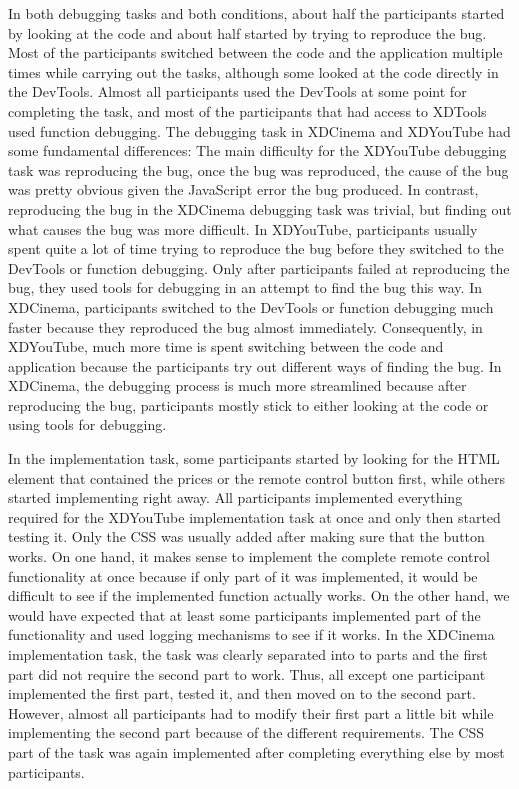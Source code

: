 In both debugging tasks and both conditions, about half the participants started by looking at the code and about half started by trying to reproduce the bug. Most of the participants switched between the code and the application multiple times while carrying out the tasks, although some looked at the code directly in the DevTools. Almost all participants used the DevTools at some point for completing the task, and most of the participants that had access to XDTools used function debugging. The debugging task in XDCinema and XDYouTube had some fundamental differences: The main difficulty for the XDYouTube debugging task was reproducing the bug, once the bug was reproduced, the cause of the bug was pretty obvious given the JavaScript error the bug produced. In contrast, reproducing the bug in the XDCinema debugging task was trivial, but finding out what causes the bug was more difficult. In XDYouTube, participants usually spent quite a lot of time trying to reproduce the bug before they switched to the DevTools or function debugging. Only after participants failed at reproducing the bug, they used tools for debugging in an attempt to find the bug this way. In XDCinema, participants switched to the DevTools or function debugging much faster because they reproduced the bug almost immediately. Consequently, in XDYouTube, much more time is spent switching between the code and application because the participants try out different ways of finding the bug. In XDCinema, the debugging process is much more streamlined because after reproducing the bug, participants mostly stick to either looking at the code or using tools for debugging.

In the implementation task, some participants started by looking for the HTML element that contained the prices or the remote control button first, while others started implementing right away. All participants implemented everything required for the XDYouTube implementation task at once and only then started testing it. Only the CSS was usually added after making sure that the button works. On one hand, it makes sense to implement the complete remote control functionality at once because if only part of it was implemented, it would be difficult to see if the implemented function actually works. On the other hand, we would have expected that at least some participants implemented part of the functionality and used logging mechanisms to see if it works. In the XDCinema implementation task, the task was clearly separated into to parts and the first part did not require the second part to work. Thus, all except one participant implemented the first part, tested it, and then moved on to the second part. However, almost all participants had to modify their first part a little bit while implementing the second part because of the different requirements. The CSS part of the task was again implemented after completing everything else by most participants.

